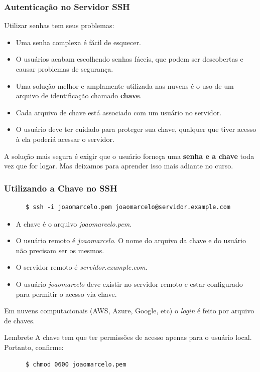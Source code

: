 \documentclass{beamer}
\begin{document}
\begin{frame}
   \frametitle{Autenticação no Servidor SSH}
   Utilizar senhas tem seus problemas:
   \begin{itemize}
      \item Uma senha complexa é fácil de esquecer.
      \item O usuários acabam escolhendo senhas fáceis, que podem ser descobertas e causar problemas de segurança.
      \item Uma solução melhor e amplamente utilizada nas nuvens é o uso de um arquivo de identificação chamado \textbf{chave}.
      \item Cada arquivo de chave está associado com um usuário no servidor.
      \item O usuário deve ter cuidado para proteger sua chave, qualquer que tiver acesso à ela poderiá acessar o servidor.
   \end{itemize}
   A solução mais segura é exigir que o usuário forneça uma \textbf{senha e a chave} toda vez que for logar. Mas deixamos para aprender isso mais adiante no curso.
\end{frame}

\begin{frame}[fragile]
   \frametitle{Utilizando a Chave no SSH}
   \begin{verbatim}
      $ ssh -i joaomarcelo.pem joaomarcelo@servidor.example.com
   \end{verbatim}
   \begin{itemize}
      \item A chave é o arquivo \textit{joaomarcelo.pem}.
      \item O usuário remoto é \textit{joaomarcelo}. O nome do arquivo da chave e do usuário não precisam ser os mesmos.
      \item O servidor remoto é \textit{servidor.example.com}.
      \item O usuário \textit{joaomarcelo} deve existir no servidor remoto e estar configurado para permitir o acesso via chave.
   \end{itemize}
   Em nuvens computacionais (AWS, Azure, Google, etc) o \textit{login} é feito por arquivo de chaves.
   \begin{block}{Lembrete}
   A chave tem que ter permissões de acesso apenas para o usuário local. Portanto, confirme:
   \begin{verbatim}
      $ chmod 0600 joaomarcelo.pem
   \end{verbatim}
   \end{block}
\end{frame}
\end{document}
